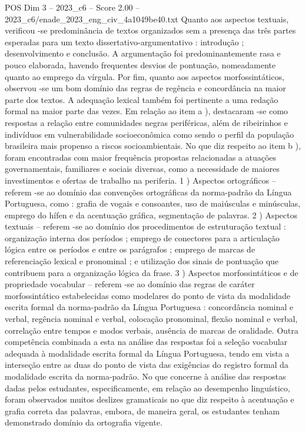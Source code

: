 \begin{textsample}{POS Dim 3 – 2023\_c6 – Score 2.00 – 2023\_c6/enade\_2023\_eng\_civ\_4a1049be40.txt}
Quanto aos aspectos textuais, verificou -se predominância de textos organizados sem a presença das três partes esperadas para um texto dissertativo-argumentativo : introdução ; desenvolvimento e conclusão.
A argumentação foi predominantemente rasa e pouco elaborada, havendo frequentes desvios de pontuação, nomeadamente quanto ao emprego da vírgula.
Por fim, quanto aos aspectos morfossintáticos, observou -se um bom domínio das regras de regência e concordância na maior parte dos textos.
A adequação lexical também foi pertinente a uma redação formal na maior parte das vezes.
Em relação ao item a ), destacaram -se como respostas a relação entre comunidades negras periféricas, além de ribeirinhos e indivíduos em vulnerabilidade socioeconômica como sendo o perfil da população brasileira mais propenso a riscos socioambientais.
No que diz respeito ao item b ), foram encontradas com maior frequência propostas relacionadas a atuações governamentais, familiares e sociais diversas, como a necessidade de maiores investimentos e ofertas de trabalho na periferia. 1 ) Aspectos ortográficos – referem -se ao domínio das convenções ortográficas da norma-padrão da Língua Portuguesa, como : grafia de vogais e consoantes, uso de maiúsculas e minúsculas, emprego do hífen e da acentuação gráfica, segmentação de palavras. 2 ) Aspectos textuais – referem -se ao domínio dos procedimentos de estruturação textual : organização interna dos períodos ; emprego de conectores para a articulação lógica entre os períodos e entre os parágrafos ; emprego de marcas de referenciação lexical e pronominal ; e utilização dos sinais de pontuação que contribuem para a organização lógica da frase. 3 ) Aspectos morfossintáticos e de propriedade vocabular – referem -se ao domínio das regras de caráter morfossintático estabelecidas como modelares do ponto de vista da modalidade escrita formal da norma-padrão da Língua Portuguesa : concordância nominal e verbal, regência nominal e verbal, colocação pronominal, flexão nominal e verbal, correlação entre tempos e modos verbais, ausência de marcas de oralidade.
Outra competência combinada a esta na análise das respostas foi a seleção vocabular adequada à modalidade escrita formal da Língua Portuguesa, tendo em vista a interseção entre as duas do ponto de vista das exigências do registro formal da modalidade escrita da norma-padrão.
No que concerne à análise das respostas dadas pelos estudantes, especificamente, em relação ao desempenho linguístico, foram observados muitos deslizes gramaticais no que diz respeito à acentuação e grafia correta das palavras, embora, de maneira geral, os estudantes tenham demonstrado domínio da ortografia vigente.

\end{textsample}
